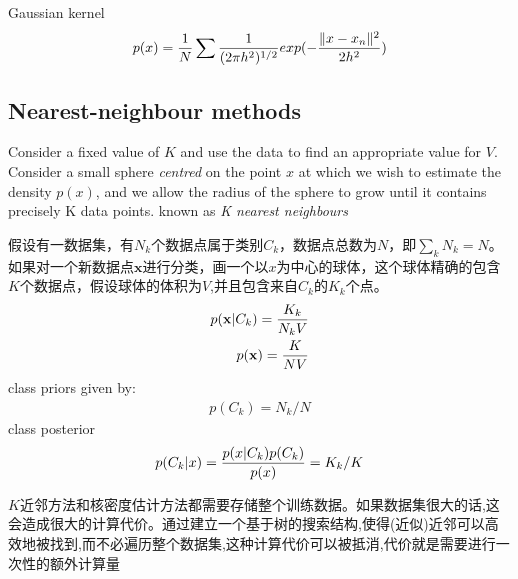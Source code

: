 \documentclass[a4paper]{article}
\begin{document}
Gaussian kernel
\begin{align}
  p(x) = {1 \over N} \sum {1 \over (2 \pi h^2)^{1/2}} exp({- {\|x-x_n\|^2 \over 2h^2 }})
\end{align}

\subsection{Nearest-neighbour methods}
\label{sec:2.5.2}
Consider a ﬁxed value of $K$ and use the data to ﬁnd an appropriate value for $V$.
Consider a small sphere \emph{centred} on the point $x$ at which we wish to estimate the  density $p(x)$, and we allow the radius of the sphere to grow until it contains precisely K data points. known as \textit{K nearest neighbours}

假设有一数据集，有$N_k$个数据点属于类别$C_k$，数据点总数为$N$，即$\sum_k N_k = N$。如果对一个新数据点$\mathbf{x}$进行分类，画一个以$x$为中心的球体，这个球体精确的包含$K$个数据点，假设球体的体积为$V$,并且包含来自$C_k$的$K_k$个点。
\begin{align}
  p(\mathbf{x}|C_k) = {K_k \over N_kV}\\
  p(\mathbf{x}) = {K \over NV}
\end{align}
class priors given by:
\begin{align}
  p(C_k) = N_k/N
\end{align}
class posterior
\begin{align}
  p(C_k|x) = {p(x|C_k)p(C_k) \over p(x)} = K_k/K
\end{align}

$K$近邻方法和核密度估计方法都需要存储整个训练数据。如果数据集很大的话,这会造成很大的计算代价。通过建立一个基于树的搜索结构,使得(近似)近邻可以高效地被找到,而不必遍历整个数据集,这种计算代价可以被抵消,代价就是需要进行一次性的额外计算量
\end{document}
